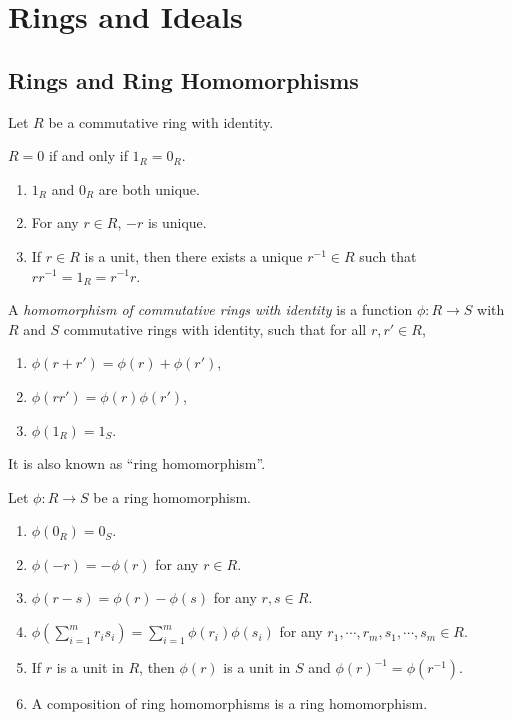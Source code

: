 \chapter{Rings and Ideals}

\section*{Rings and Ring Homomorphisms}

Let $R$ be a commutative ring with identity.

\begin{fact}
    $R = 0$ if and only if $1_R = 0_R$.
\end{fact}

\begin{fact}
    \begin{enumerate}
        \item $1_R$ and $0_R$ are both unique.
        \item For any $r \in R$, $-r$ is unique.
        \item If $r \in R$ is a unit, then there exists a unique $r^{-1} \in R$ such that $rr^{-1} = 1_R = r^{-1}r$.
    \end{enumerate}
\end{fact}

\begin{definition}
    A \emph{homomorphism of commutative rings with identity} is a function $\phi: R \to S$ with $R$ and $S$ commutative rings with identity, such that for all $r,r' \in R$,
    \begin{enumerate}
        \item $\phi(r+r') = \phi(r) + \phi(r')$,
        \item $\phi(rr') = \phi(r) \phi(r')$,
        \item $\phi(1_R) = 1_S$.
    \end{enumerate}
    It is also known as ``ring homomorphism''.
\end{definition}

\begin{fact}
    Let $\phi: R \to S$ be a ring homomorphism.
    \begin{enumerate}
        \item $\phi(0_R) = 0_S$.
        \item $\phi(-r) = -\phi(r)$ for any $r \in R$.
        \item $\phi(r-s) = \phi(r) - \phi(s)$ for any $r,s \in R$.
        \item $\phi(\sum_{i=1}^mr_is_i) = \sum_{i=1}^m\phi(r_i)\phi(s_i)$ for any $r_1,\cdots,r_m,s_1,\cdots,s_m \in R$.
        \item If $r$ is a unit in $R$, then $\phi(r)$ is a unit in $S$ and $\phi(r)^{-1} = \phi(r^{-1})$.
        \item A composition of ring homomorphisms is a ring homomorphism.
    \end{enumerate}
\end{fact}

